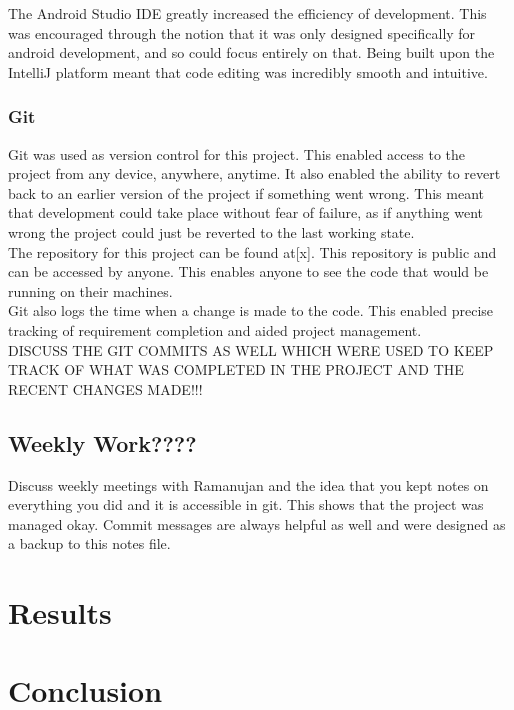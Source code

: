 \documentclass{article}
\begin{document}
The Android Studio IDE greatly increased the efficiency of development. This was encouraged through the notion that it was only designed specifically for android development, and so could focus entirely on that. Being built upon the IntelliJ platform meant that code editing was incredibly smooth and intuitive. \\

\subsubsection{Git}

Git was used as version control for this project. This enabled access to the project from any device, anywhere, anytime. It also enabled the ability to revert back to an earlier version of the project if something went wrong. This meant that development could take place without fear of failure, as if anything went wrong the project could just be reverted to the last working state.\\

The repository for this project can be found at[x]. This repository is public and can be accessed by anyone. This enables anyone to see the code that would be running on their machines.\\

Git also logs the time when a change is made to the code. This enabled precise tracking of requirement completion and aided project management. \\
DISCUSS THE GIT COMMITS AS WELL WHICH WERE USED TO KEEP TRACK OF WHAT WAS COMPLETED IN THE PROJECT AND THE RECENT CHANGES MADE!!!
\subsection{Weekly Work????}

Discuss weekly meetings with Ramanujan and the idea that you kept notes on everything you did and it is accessible in git. This shows that the project was managed okay. Commit messages are always helpful as well and were designed as a backup to this notes file.

\section{Results}

\section{Conclusion}
\end{document}
